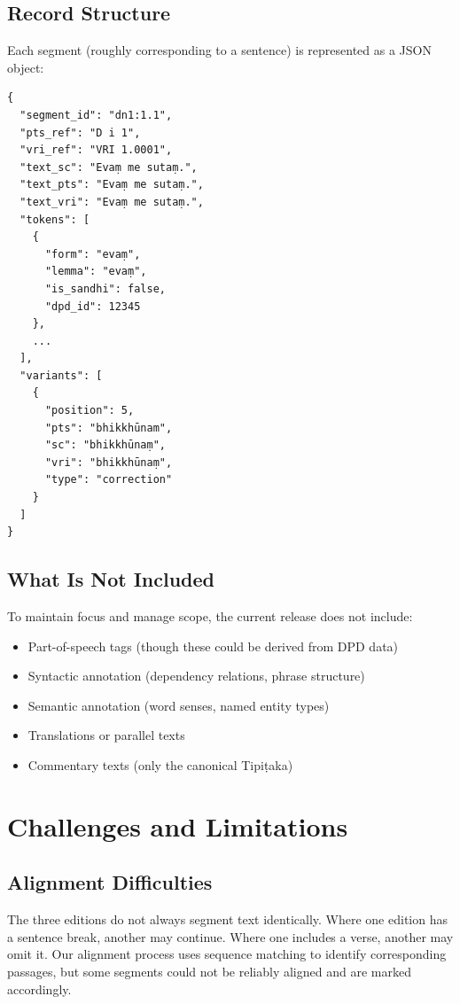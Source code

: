 \documentclass[12pt]{article}
\begin{document}
\subsection{Record Structure}

Each segment (roughly corresponding to a sentence) is represented as a JSON object:

\begin{verbatim}
{
  "segment_id": "dn1:1.1",
  "pts_ref": "D i 1",
  "vri_ref": "VRI 1.0001",
  "text_sc": "Evaṃ me sutaṃ.",
  "text_pts": "Evaṃ me sutaṃ.",
  "text_vri": "Evaṃ me sutaṃ.",
  "tokens": [
    {
      "form": "evaṃ",
      "lemma": "evaṃ",
      "is_sandhi": false,
      "dpd_id": 12345
    },
    ...
  ],
  "variants": [
    {
      "position": 5,
      "pts": "bhikkhūnam",
      "sc": "bhikkhūnaṃ",
      "vri": "bhikkhūnaṃ",
      "type": "correction"
    }
  ]
}
\end{verbatim}

\subsection{What Is Not Included}

To maintain focus and manage scope, the current release does not include:

\begin{itemize}
\item Part-of-speech tags (though these could be derived from DPD data)
\item Syntactic annotation (dependency relations, phrase structure)
\item Semantic annotation (word senses, named entity types)
\item Translations or parallel texts
\item Commentary texts (only the canonical Tipiṭaka)
\end{itemize}

\section{Challenges and Limitations}

\subsection{Alignment Difficulties}

The three editions do not always segment text identically. Where one edition has a sentence break, another may continue. Where one includes a verse, another may omit it. Our alignment process uses sequence matching to identify corresponding passages, but some segments could not be reliably aligned and are marked accordingly.
\end{document}
